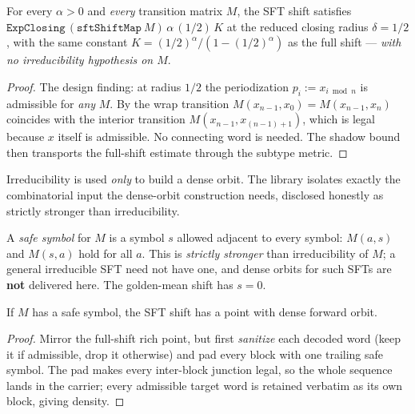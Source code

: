 \begin{theorem}\label{thm:livsic-sft-closing}
  \leanok
  For every \(\alpha>0\) and \emph{every} transition matrix \(M\), the SFT shift satisfies
  \(\texttt{ExpClosing}\,(\texttt{sftShiftMap}\ M)\,\alpha\,(1/2)\,K\) at the reduced closing radius
  \(\delta = 1/2\), with the same constant \(K = (1/2)^{\alpha}/(1-(1/2)^{\alpha})\) as the full
  shift --- \emph{with no irreducibility hypothesis on \(M\)}.
\end{theorem}
\begin{proof}\leanok
  The design finding: at radius \(1/2\) the periodization \(p_i := x_{i\bmod n}\) is admissible for
  \emph{any} \(M\). By  the wrap transition \(M(x_{n-1}, x_0) =
  M(x_{n-1}, x_n)\) coincides with the interior transition \(M(x_{n-1}, x_{(n-1)+1})\), which is
  legal because \(x\) itself is admissible. No connecting word is needed. The shadow bound then
  transports the full-shift estimate through the subtype metric.
\end{proof}

Irreducibility is used \emph{only} to build a dense orbit. The library isolates exactly the
combinatorial input the dense-orbit construction needs, disclosed honestly as strictly stronger than
irreducibility.

\begin{definition}\label{def:livsic-safesymbol}
  \leanok
  A \emph{safe symbol} for \(M\) is a symbol \(s\) allowed adjacent to every symbol:
  \(M(a,s)\) and \(M(s,a)\) hold for all \(a\). This is \emph{strictly stronger} than irreducibility
  of \(M\); a general irreducible SFT need not have one, and dense orbits for such SFTs are
  \textbf{not} delivered here. The golden-mean shift has \(s = 0\).
\end{definition}

\begin{theorem}\label{thm:livsic-sft-dense}
  \leanok
  If \(M\) has a safe symbol, the SFT shift has a point with dense forward orbit.
\end{theorem}
\begin{proof}\leanok
  Mirror the full-shift rich point, but first \emph{sanitize} each decoded word (keep it if
  admissible, drop it otherwise) and pad every block with one trailing safe symbol. The pad makes
  every inter-block junction legal, so the whole sequence lands in the carrier; every admissible
  target word is retained verbatim as its own block, giving density.
\end{proof}

